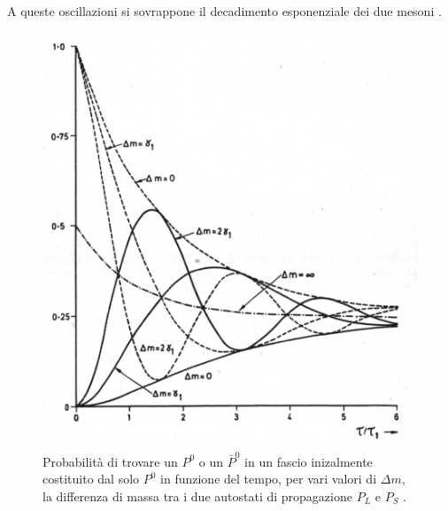 A queste oscillazioni si sovrappone il decadimento esponenziale dei due mesoni \cite{Lee}.
\begin{figure}
\begin{center}
\includegraphics[scale=0.09]{Immagini/oscillazioni}
\caption{Probabilità di trovare un $P^0$ o un $\bar{P}^0$ in un fascio inizalmente costituito dal solo $P^0$ in funzione del tempo, per vari valori di $\Delta m$, la differenza
di massa tra i due autostati di propagazione $P_L$ e $P_S$ \cite{Kabir}.}
\end{center}
\end{figure}

